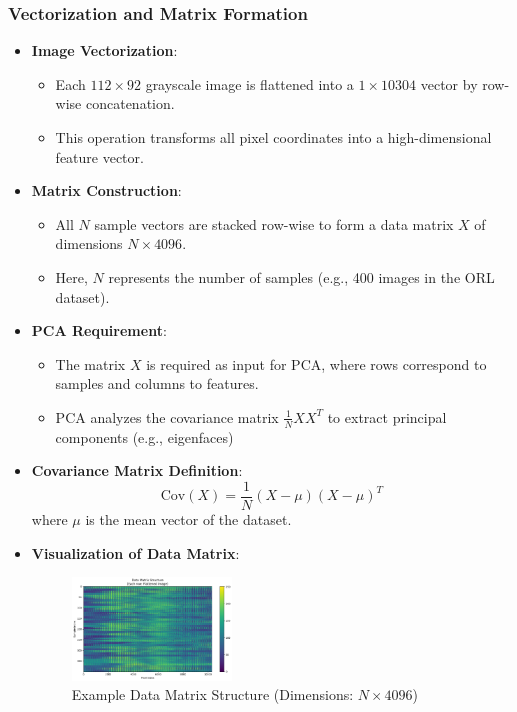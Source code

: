 \documentclass{article}
\begin{document}
	\subsubsection{Vectorization and Matrix Formation}
	\begin{itemize}
		\item \textbf{Image Vectorization}:
		\begin{itemize}
			\item Each \( 112\times 92\) grayscale image is flattened into a \(1 \times 10304\) vector by row-wise concatenation.
			\item This operation transforms all pixel coordinates into a high-dimensional feature vector.
		\end{itemize}
		
		\item \textbf{Matrix Construction}:
		\begin{itemize}
			\item All \(N\) sample vectors are stacked row-wise to form a data matrix \(X\) of dimensions \(N \times 4096\).
			\item Here, \(N\) represents the number of samples (e.g., 400 images in the ORL dataset).
		\end{itemize}
		
		\item \textbf{PCA Requirement}:
		\begin{itemize}
			\item The matrix \(X\) is required as input for PCA, where rows correspond to samples and columns to features.
			\item PCA analyzes the covariance matrix \(\frac{1}{N}XX^T\) to extract principal components (e.g., eigenfaces)
		\end{itemize}
		
		\item \textbf{Covariance Matrix Definition}:
		\[
		\text{Cov}(X) = \frac{1}{N} (X - \mu)(X - \mu)^T
		\]
		where \(\mu\) is the mean vector of the dataset.
		
		\item \textbf{Visualization of Data Matrix}:
		\begin{figure}[h!]
			\centering
			\includegraphics[width=0.4\textwidth]{Data Matrix Structure.png}
			\caption{Example Data Matrix Structure (Dimensions: \(N \times 4096\))}
			\label{fig:matrix}
		\end{figure}
	\end{itemize}
		
\end{document}
